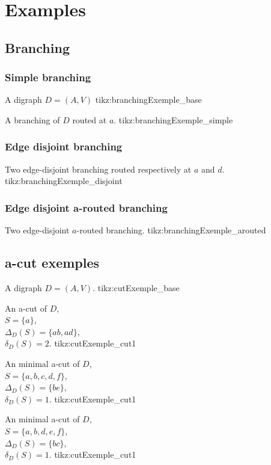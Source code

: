 \documentclass{article}
\begin{document}
\section{Examples}

\subsection{Branching}

\subsubsection{Simple branching}
\begin{minipage}{.5\textwidth}
\centering
{}
{A digraph $D=(A, V)$}
{tikz:branchingExemple_base}
\end{minipage}%
\begin{minipage}{.5\textwidth}
\centering
{}
{A branching of $D$ routed at $a$.}
{tikz:branchingExemple_simple}
\end{minipage}


\subsubsection{Edge disjoint branching}

{Two edge-disjoint branching routed respectively at $a$ and $d$.}
{tikz:branchingExemple_disjoint}

\subsubsection{Edge disjoint a-routed branching}

{Two edge-disjoint $a$-routed branching.}
{tikz:branchingExemple_arouted}

\subsection{a-cut exemples}

{A digraph $D=(A, V)$.}
{tikz:cutExemple_base}

{An a-cut of $D$,\\ $S = \{a\}$,\\ $\Delta_D(S)=\{ab, ad\}$,\\ $\delta_D(S) = 2$.}
{tikz:cutExemple_cut1}

{An minimal a-cut of $D$,\\ $S = \{a, b, c, d, f\}$,\\ $\Delta_D(S)=\{be\}$,\\ $\delta_D(S) = 1$.}
{tikz:cutExemple_cut1}

{An minimal a-cut of $D$,\\ $S = \{a, b, d, e, f\}$,\\ $\Delta_D(S)=\{bc\}$,\\ $\delta_D(S) = 1$.}
{tikz:cutExemple_cut1}
\end{document}
